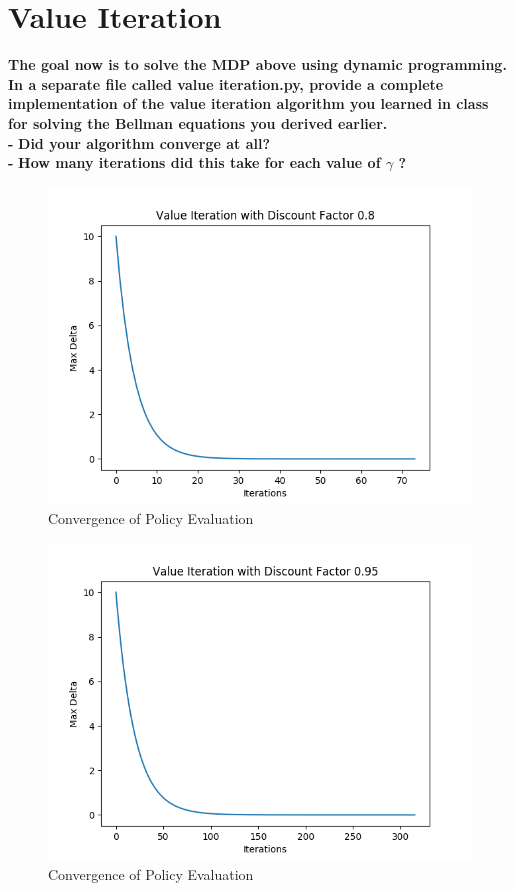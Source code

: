 \documentclass[11pt]{article}
\begin{document}
\newpage
\section{Value Iteration}
\textbf{The goal now is to solve the MDP above using dynamic programming. In a separate
file called value iteration.py, provide a complete implementation of the value
iteration algorithm you learned in class for solving the Bellman equations you
derived earlier.}
\\

\noindent
\textbf{-}
\noindent
\textbf{Did your algorithm converge at all?}
\\

\noindent
\textbf{-}
\noindent
\textbf{How many iterations did this take for each value of $\gamma$ ?}

\begin{figure}[h]
\includegraphics[scale=0.5]{Value_8}
\centering
\caption{Convergence of Policy Evaluation}
\end{figure}

\begin{figure}[h]
\includegraphics[scale=0.5]{Value_95}
\centering
\caption{Convergence of Policy Evaluation}
\end{figure}
\end{document}
